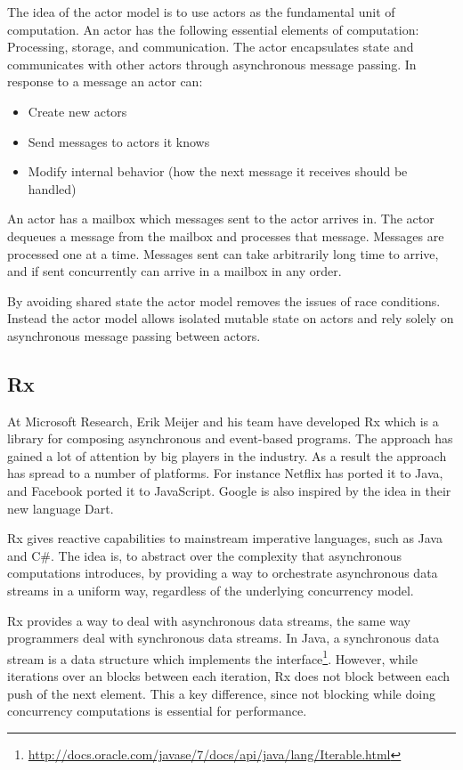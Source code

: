 The idea of the actor model is to use actors as the fundamental unit of computation. An actor has the following essential elements of computation\cite{actorLangNextVideo}: Processing, storage, and communication. The actor encapsulates state and communicates with other actors through asynchronous message passing. In response to a message an actor can\cite{hewitt2014actor}:
\begin{itemize}
\item Create new actors
\item Send messages to actors it knows
\item Modify internal behavior (how the next message it receives should be handled)
\end{itemize}
An actor has a mailbox which messages sent to the actor arrives in. The actor dequeues a message from the mailbox and processes that message. Messages are processed one at a time. Messages sent can take arbitrarily long time to arrive, and if sent concurrently can arrive in a mailbox in any order\cite{hewitt2014actor}.

By avoiding shared state the actor model removes the issues of race conditions\citep[Chap. 32]{odersky2011programming}. Instead the actor model allows isolated mutable state on actors and rely solely on asynchronous message passing between actors.

\subsection{\acl{Rx}}
At Microsoft Research, Erik Meijer and his team have developed \ac{Rx} which is a library for composing asynchronous and event-based programs. The approach has gained a lot of attention by big players in the industry. As a result the approach has spread to a number of platforms. For instance Netflix has ported it to Java\cite{RxJava}, and Facebook ported it to JavaScript\cite{react}. Google is also inspired by the idea in their new language Dart\cite{dart}.

\ac{Rx} gives reactive capabilities to mainstream imperative languages, such as Java and C\#\cite{csharp}. The idea is, to abstract over the complexity that asynchronous computations introduces, by providing a way to orchestrate asynchronous data streams in a uniform way, regardless of the underlying concurrency model.

\ac{Rx} provides a way to deal with asynchronous data streams, the same way programmers deal with synchronous data streams. In Java, a synchronous data stream is a data structure which implements the  interface\footnote{\url{http://docs.oracle.com/javase/7/docs/api/java/lang/Iterable.html}}. However, while iterations over an  blocks between each iteration, \ac{Rx} does not block between each push of the next element. This a key difference, since not blocking while doing concurrency computations is essential for performance.

